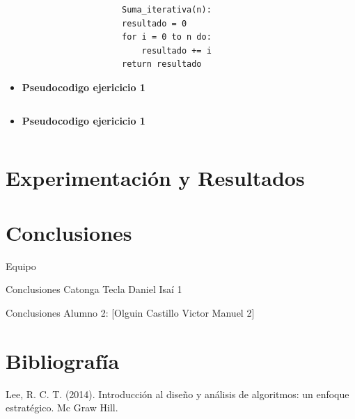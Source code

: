 \documentclass[12pt,twoside]{article}
\begin{document}
\begin{itemize}
\begin{centering}
\begin{verbatim}
                    Suma_iterativa(n):
                    resultado = 0
                    for i = 0 to n do:
                        resultado += i
                    return resultado
\end{verbatim}
\end{centering}

\newpage



\item \textbf{Pseudocodigo ejericicio 1}\\

\begin{centering}
\begin{verbatim}

\end{verbatim}
\end{centering}

\item \textbf{Pseudocodigo ejericicio 1}\\

\begin{centering}
\begin{verbatim}

\end{verbatim}
\end{centering}

\end{itemize}

\section{Experimentación y Resultados}

\section{Conclusiones}


\medskip

Equipo

Conclusiones Catonga Tecla Daniel Isaí 1

Conclusiones Alumno 2: [Olguin Castillo Victor Manuel 2]\\


\section{Bibliograf\'ia}

Lee, R. C. T. (2014). Introducción al diseño y análisis de algoritmos: un enfoque estratégico. Mc Graw Hill.
\medskip
\end{document}
